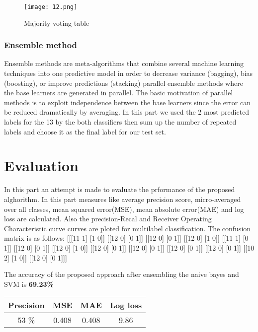 \documentclass{article}
\begin{document}
{\begin{figure}[H]
   \centering
   \texttt{[image: 12.png]}
   \centering
   \caption{Majority voting table}
   \label{simulationfigure}
\end{figure}
\subsubsection{Ensemble method}
\par{Ensemble methods are meta-algorithms that combine several machine learning techniques into one predictive model in order to decrease variance (bagging), bias (boosting), or improve predictions (stacking) parallel ensemble methods where the base learners are generated in parallel. The basic motivation of parallel methods is to exploit independence between the base learners since the error can be reduced dramatically by averaging. In this part we used the 2 most predicted labels for the 13 by the both classifiers then sum up the number of repeated labels and choose it as the final label for our test set.}

\section{Evaluation}
\par{ In this part an attempt is made to evaluate the prformance of the proposed alghorithm. In this part measures like average precision score, micro-averaged over all classes, mean squared error(MSE), mean absolute error(MAE) and log loss are calculated. Also the precision-Recal and Receiver Operating Characteristic curve curves are ploted for multilabel classification. The confusion matrix is as follows:
[[[11 1]  [1 0]] [[12 0] [0 1]] [[12 0] [0 1]] [[12 0] [1 0]] [[11 1] [0 1]] [[12 0] [0 1]] [[12 0] [1 0]] [[12 0] [0 1]] [[12 0] [0 1]] [[12 0] [0 1]] [[12 0] [0 1]] [[10 2] [1 0]] [[12 0] [0 1]]]}

The accuracy of the proposed approach after ensembling the naive bayes and SVM is  \textbf{69.23\%}





\begin{center}
 \begin{tabular}{||c c c c||} 
 \hline
 Precision & MSE & MAE & Log loss\\ [2ex] 
 \hline\hline
 53 \% & 0.408 & 0.408 & 9.86  \\  [2ex] 
 \hline

\end{tabular}
\end{center}


}
\end{document}
